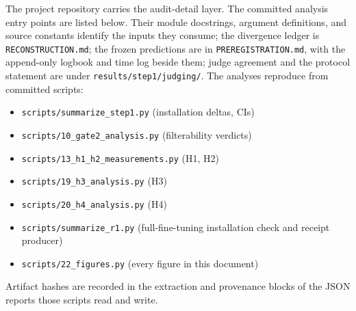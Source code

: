 The project repository carries the audit-detail layer. The committed
analysis entry points are listed below. Their module docstrings, argument
definitions, and source constants identify the inputs they consume; the
divergence ledger is \texttt{RECONSTRUCTION.md}; the frozen predictions are in
\texttt{PREREGISTRATION.md}, with the append-only logbook and time log
beside them; judge agreement and the protocol statement are under
\texttt{results/step1/judging/}. The analyses reproduce from committed
scripts:

\begin{itemize}[leftmargin=2em, itemsep=1pt]
  \item \texttt{scripts/summarize\_step1.py} (installation deltas, CIs)
  \item \texttt{scripts/10\_gate2\_analysis.py} (filterability verdicts)
  \item \texttt{scripts/13\_h1\_h2\_measurements.py} (H1, H2)
  \item \texttt{scripts/19\_h3\_analysis.py} (H3)
  \item \texttt{scripts/20\_h4\_analysis.py} (H4)
  \item \texttt{scripts/summarize\_r1.py} (full-fine-tuning installation check and receipt producer)
  \item \texttt{scripts/22\_figures.py} (every figure in this document)
\end{itemize}

Artifact hashes are recorded in the extraction and provenance blocks of
the JSON reports those scripts read and write.
